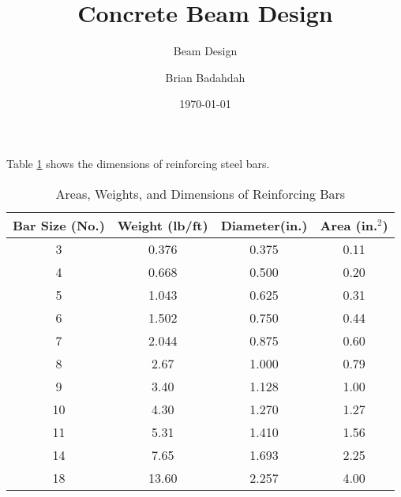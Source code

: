 \documentclass[landscape, twocolumn, 12pt]{article}
\title{Concrete Beam Design}
\subtitle{Beam Design}
\author{Brian Badahdah}
\date{\today}
\begin{document}
\maketitle





Table \ref{Tab:bars} shows the dimensions of reinforcing steel bars.

\begin{table}[h]
\centering
\caption{Areas, Weights, and Dimensions of Reinforcing Bars}
\label{Tab:bars}
\begin{tabular}{|c|c|c|c|}\hline
Bar Size (No.)&Weight (lb/ft)&Diameter(in.)&Area (in.$^2$) \\ \hline
3&0.376&0.375&0.11 \\ \hline
4&0.668&0.500&0.20 \\ \hline
5&1.043&0.625&0.31 \\ \hline
6&1.502&0.750&0.44 \\ \hline
7&2.044&0.875&0.60 \\ \hline
8&2.67&1.000&0.79 \\ \hline
9&3.40&1.128&1.00 \\ \hline
10&4.30&1.270&1.27 \\ \hline
11&5.31&1.410&1.56 \\ \hline
14&7.65&1.693&2.25 \\ \hline
18&13.60&2.257&4.00 \\ \hline
\end{tabular}
\end{table}

%
%
\end{document}
